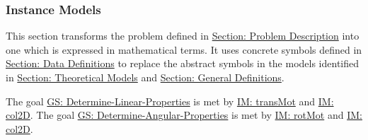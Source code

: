 \documentclass[12pt]{article}
\begin{document}
\subsubsection{Instance Models}
\label{Sec:IMs}
This section transforms the problem defined in \hyperref[Sec:ProbDesc]{Section: Problem Description} into one which is expressed in mathematical terms. It uses concrete symbols defined in \hyperref[Sec:DDs]{Section: Data Definitions} to replace the abstract symbols in the models identified in \hyperref[Sec:TMs]{Section: Theoretical Models} and \hyperref[Sec:GDs]{Section: General Definitions}.

The goal \hyperref[linearGS]{GS: Determine-Linear-Properties} is met by \hyperref[IM:transMot]{IM: transMot} and \hyperref[IM:col2D]{IM: col2D}. The goal \hyperref[angularGS]{GS: Determine-Angular-Properties} is met by \hyperref[IM:rotMot]{IM: rotMot} and \hyperref[IM:col2D]{IM: col2D}.
\end{document}
